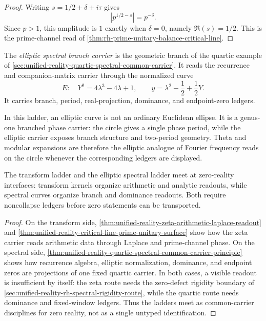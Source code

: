 \begin{proof}
Writing $s=1/2+\delta+i\tau$ gives
$$
|p^{1/2-s}|=p^{-\delta}.
$$
Since $p>1$, this amplitude is $1$ exactly when $\delta=0$, namely
$\Re(s)=1/2$. This is the prime-channel read of
\autoref{thm:rh-prime-unitary-balance-critical-line}.
\end{proof}

\begin{definition}
\label{def:unified-reality-elliptic-spectral-branch-carrier}
The \emph{elliptic spectral branch carrier} is the geometric branch of
the quartic example of
\autoref{sec:unified-reality-quartic-spectral-common-carrier}. It reads
the recurrence and companion-matrix carrier through the normalized curve
$$
E:\quad Y^2=4\lambda^3-4\lambda+1,
\qquad
y=\lambda^2-\frac12+\frac12Y.
$$
It carries branch, period, real-projection, dominance, and endpoint-zero
ledgers.
\end{definition}

\begin{principle}
\label{prin:unified-reality-elliptic-branched-phase-carriers}
In this ladder, an elliptic curve is not an ordinary Euclidean ellipse.
It is a genus-one branched phase carrier: the circle gives a single
phase period, while the elliptic carrier exposes branch structure and
two-period geometry. Theta and modular expansions are therefore the
elliptic analogue of Fourier frequency reads on the circle whenever the
corresponding ledgers are displayed.
\end{principle}

\begin{theorem}
\label{thm:unified-reality-transform-and-spectral-ladders-meet}
The transform ladder and the elliptic spectral ladder meet at
zero-reality interfaces: transform kernels organize arithmetic and
analytic readouts, while spectral curves organize branch and dominance
readouts. Both require noncollapse ledgers before zero statements can be
transported.
\end{theorem}

\begin{proof}
On the transform side,
\autoref{thm:unified-reality-zeta-arithmetic-laplace-readout} and
\autoref{thm:unified-reality-critical-line-prime-unitary-surface} show
how the zeta carrier reads arithmetic data through Laplace and
prime-channel phase. On the spectral side,
\autoref{thm:unified-reality-quartic-spectral-common-carrier-principle}
shows how recurrence algebra, elliptic normalization, dominance, and
endpoint zeros are projections of one fixed quartic carrier. In both
cases, a visible readout is insufficient by itself: the zeta route needs
the zero-defect rigidity boundary of
\autoref{sec:unified-reality-rh-spectral-rigidity-route}, while the
quartic route needs dominance and fixed-window ledgers. Thus the ladders
meet as common-carrier disciplines for zero reality, not as a single
untyped identification.
\end{proof}

